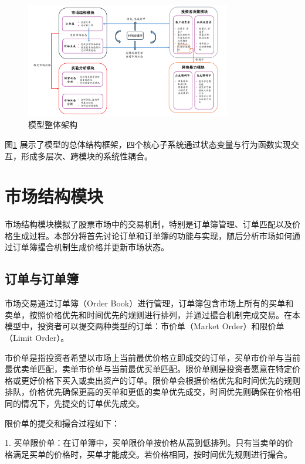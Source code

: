\begin{figure}[h]
    \centering
    \includegraphics[width=0.8\textwidth]{image/3-1_structure.pdf}
    \caption{模型整体架构}
    \label{fig:architecture}
\end{figure}

图\ref{fig:architecture} 展示了模型的总体结构框架，四个核心子系统通过状态变量与行为函数实现交互，形成多层次、跨模块的系统性耦合。








\section{市场结构模块}

市场结构模块模拟了股票市场中的交易机制，特别是订单簿管理、订单匹配以及价格生成过程。本部分将首先讨论订单和订单簿的功能与实现，随后分析市场如何通过订单簿撮合机制生成价格并更新市场状态。

\subsection{订单与订单簿}


市场交易通过订单簿（Order Book）进行管理，订单簿包含市场上所有的买单和卖单，按照价格优先和时间优先的规则进行排列，并通过撮合机制完成交易。在本模型中，投资者可以提交两种类型的订单：市价单（Market Order）和限价单（Limit Order）。

市价单是指投资者希望以市场上当前最优价格立即成交的订单，买单市价单与当前最优卖单匹配，卖单市价单与当前最优买单匹配。限价单则是投资者愿意在特定价格或更好价格下买入或卖出资产的订单。限价单会根据价格优先和时间优先的规则排队，价格优先确保更高的买单和更低的卖单优先成交，时间优先则确保在价格相同的情况下，先提交的订单优先成交。

限价单的提交和撮合过程如下：

1. 买单限价单：在订单簿中，买单限价单按价格从高到低排列。只有当卖单的价格满足买单的价格时，买单才能成交。若价格相同，按时间优先规则进行撮合。

